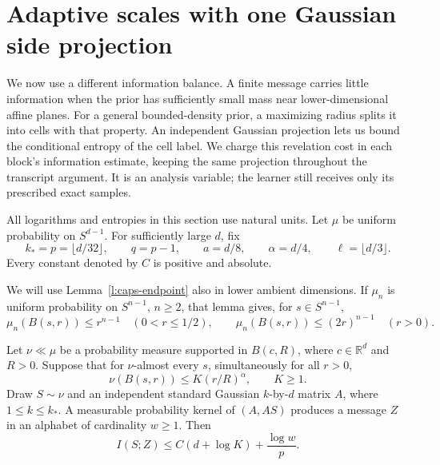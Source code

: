 \section{Adaptive scales with one Gaussian side projection}
\label{l:side:section}

We now use a different information balance.  A finite message carries
little information when the prior has sufficiently small mass near
lower-dimensional affine planes.  For a general bounded-density prior,
a maximizing radius splits it into cells with that property.  An independent
Gaussian projection lets us bound the conditional entropy of the cell
label.  We charge this revelation cost in each block's information
estimate, keeping the same projection throughout the transcript argument.
It is an analysis
variable; the learner still receives only its prescribed exact samples.

All logarithms and entropies in this section use natural units.  Let
$\mu$ be uniform probability on $S^{d-1}$.  For sufficiently large $d$,
fix
\begin{equation}\label{l:side:parameters}
 k_*=p=\lfloor d/32\rfloor,\qquad q=p-1,\qquad
 a=d/8,\qquad \alpha=d/4,\qquad \ell=\lfloor d/3\rfloor.
\end{equation}
Every constant denoted by $C$ is positive and absolute.

We will use Lemma~\ref{l:caps-endpoint} also in lower ambient
dimensions.  If $\mu_n$ is uniform probability on $S^{n-1}$, $n\ge2$,
that lemma gives, for $s\in S^{n-1}$,
\begin{equation}\label{l:side:caps}
 \mu_n(B(s,r))\le r^{n-1}\quad(0<r\le1/2),\qquad
 \mu_n(B(s,r))\le(2r)^{n-1}\quad(r>0).
\end{equation}

\begin{lemma}
\label{l:side:local-information}
Let $\nu\ll\mu$ be a probability measure supported in $B(c,R)$, where
$c\in\mathbb R^d$ and $R>0$.  Suppose that for $\nu$-almost every $s$, simultaneously for all
$r>0$,
\begin{equation}\label{l:side:local-mass}
 \nu(B(s,r))\le K(r/R)^\alpha,\qquad K\ge1.
\end{equation}
Draw $S\sim\nu$ and an independent standard Gaussian $k$-by-$d$ matrix
$A$, where $1\le k\le k_*$.  A measurable probability kernel of
$(A,AS)$ produces a message $Z$ in an alphabet of cardinality $w\ge1$.
Then
\begin{equation}\label{l:side:local-bound}
 I(S;Z)\le C(d+\log K)+\frac{\log w}{p}.
\end{equation}
\end{lemma}

